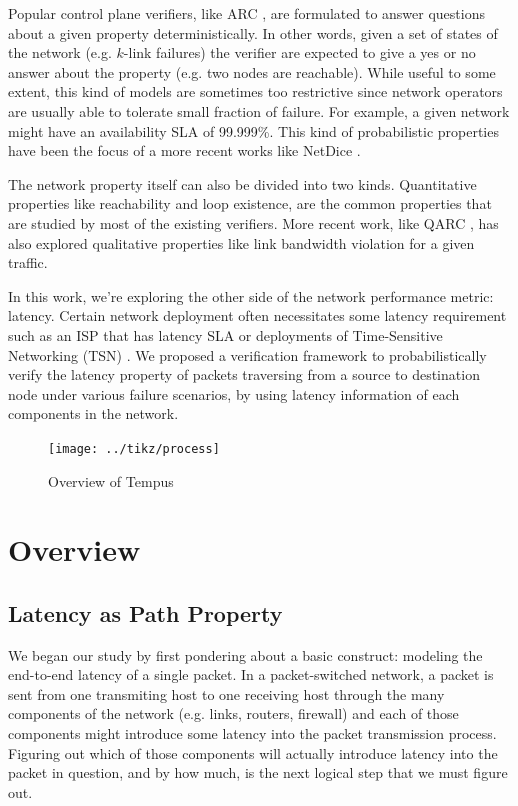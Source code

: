 \documentclass[10pt,sigconf,letterpaper,anonymous,nonacm]{acmart}
\begin{document}
Popular control plane verifiers, like ARC \cite{gember2016fast}, are formulated to answer 
questions about a given property deterministically. 
In other words, given a set of states of the network (e.g. $k$-link failures) the verifier are 
expected to give a yes or no answer about the property (e.g. two nodes are reachable).
While useful to some extent, this kind of models are sometimes too restrictive since network 
operators are usually able to tolerate small fraction of failure. 
For example, a given network might have an availability SLA of 99.999\%. 
This kind of probabilistic properties have been the focus of a more recent works like NetDice 
\cite{steffen2020probabilistic}.

The network property itself can also be divided into two kinds. 
Quantitative properties like reachability and loop existence, are the common properties that are 
studied by most of the existing verifiers. 
More recent work, like QARC \cite{subramanian2020detecting}, has also explored qualitative 
properties like link bandwidth violation for a given traffic.

In this work, we're exploring the other side of the network performance metric: latency. 
Certain network deployment often necessitates some latency requirement such as an ISP that has 
latency SLA \cite{Verizon} or deployments of Time-Sensitive Networking (TSN) \cite{TSN}.
We proposed a verification framework to probabilistically verify the latency property of packets 
traversing from a source to destination node under various failure scenarios, by using latency 
information of each components in the network.

\begin{figure}[h]
    \centering
    \texttt{[image: ../tikz/process]}
    \caption{Overview of Tempus}
    \label{fig:process}
\end{figure}

\section{Overview}
\subsection{Latency as Path Property} 
We began our study by first pondering about a basic construct: modeling the end-to-end latency of 
a single packet.
In a packet-switched network, a packet is sent from one transmiting host to one receiving host 
through the many components of the network (e.g. links, routers, firewall) and each of those 
components might introduce some latency into the packet transmission process.
Figuring out which of those components will actually introduce latency into the packet in question, 
and by how much, is the next logical step that we must figure out.
\end{document}
